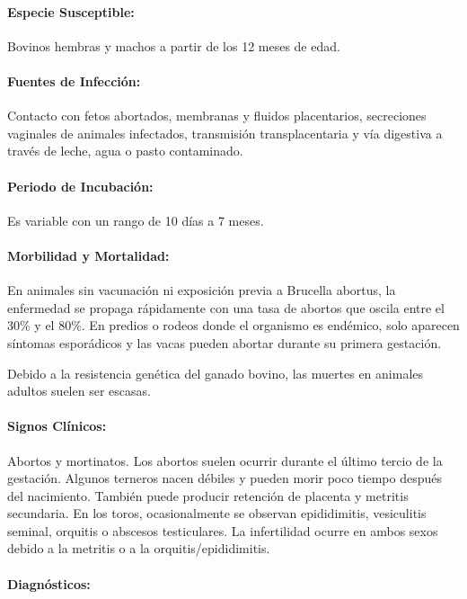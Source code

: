             \paragraph{Especie Susceptible:} Bovinos hembras y machos a partir de los 12 meses de edad.

            \paragraph{Fuentes de Infección:} Contacto con fetos abortados, membranas y fluidos placentarios, secreciones vaginales de animales infectados, transmisión transplacentaria y vía digestiva a través de leche, agua o pasto contaminado.

            \paragraph{Periodo de Incubación:} Es variable con un rango de 10 días a 7 meses.

            \paragraph{Morbilidad y Mortalidad:} En animales sin vacunación ni exposición previa a Brucella abortus, la enfermedad se propaga rápidamente con una tasa de abortos que oscila entre el 30\!\% y el 80\!\%. En predios o rodeos donde el organismo es endémico, solo aparecen síntomas esporádicos y las vacas pueden abortar durante su primera gestación.

            Debido a la resistencia genética del ganado bovino, las muertes en animales adultos suelen ser escasas.

            \paragraph{Signos Clínicos:} Abortos y mortinatos. Los abortos suelen ocurrir durante el último tercio de la gestación. Algunos terneros nacen débiles y pueden morir poco tiempo después del nacimiento. También puede producir retención de placenta y metritis secundaria. En los toros, ocasionalmente se observan epididimitis, vesiculitis seminal, orquitis o abscesos testiculares. La infertilidad ocurre en ambos sexos debido a la metritis o a la orquitis/epididimitis. 

            \paragraph{Diagnósticos:}

